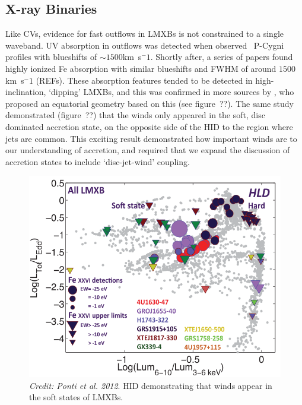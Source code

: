 \subsection{X-ray Binaries}
\label{sec:xrb_winds}

Like CVs, evidence for fast outflows in LMXBs is not constrained to 
a single waveband. UV absorption in outflows was detected when
\cite{ioannau2003} observed \civfull\ P-Cygni profiles with blueshifts 
of $\sim1500$km~s$^-1$. Shortly after, a series of papers found 
highly ionized Fe absorption with similar blueshifts and FWHM of around 
$1500$km~s$^-1$ (REFs). These absorption features tended to be detected
in high-inclination, `dipping' LMXBs, and this was confirmed in more sources
by \cite{ponti2012}, who proposed an equatorial geometry based on this (see 
figure~??). The same study demonstrated (figure~??) that
the winds only appeared in the soft, 
disc dominated accretion state, on the opposite side of the HID to the
region where jets are common. This exciting result demonstrated how
important winds are to our understanding of accretion, and required that
we expand the discussion of accretion states to include `disc-jet-wind' 
coupling.

\begin{figure}
\centering
\includegraphics[width=1.0\textwidth]{figures/01-intro/ponti_hid.png}
\caption
{
{\sl Credit: Ponti et al. 2012}. 
HID demonstrating that winds appear in the soft states of LMXBs.
} 
\label{fig:ponti_hid}
\end{figure}

